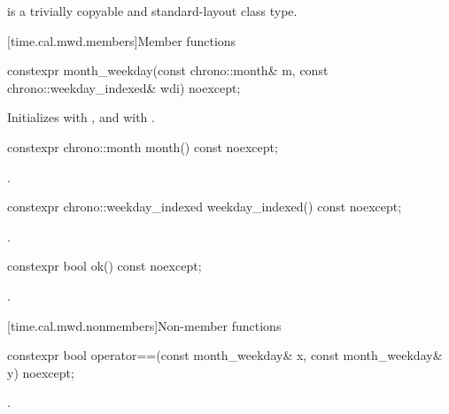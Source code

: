 \pnum
{} is a trivially copyable and standard-layout class type.

[time.cal.mwd.members]{Member functions}

%
\begin{itemdecl}
constexpr month_weekday(const chrono::month& m, const chrono::weekday_indexed& wdi) noexcept;
\end{itemdecl}

\begin{itemdescr}
\pnum
\effects
Initializes  with , and  with .
\end{itemdescr}

%
\begin{itemdecl}
constexpr chrono::month month() const noexcept;
\end{itemdecl}

\begin{itemdescr}
\pnum
\returns
{}.
\end{itemdescr}

%
\begin{itemdecl}
constexpr chrono::weekday_indexed weekday_indexed() const noexcept;
\end{itemdecl}

\begin{itemdescr}
\pnum
\returns
{}.
\end{itemdescr}

%
\begin{itemdecl}
constexpr bool ok() const noexcept;
\end{itemdecl}

\begin{itemdescr}
\pnum
\returns
{}.
\end{itemdescr}

[time.cal.mwd.nonmembers]{Non-member functions}

%
\begin{itemdecl}
constexpr bool operator==(const month_weekday& x, const month_weekday& y) noexcept;
\end{itemdecl}

\begin{itemdescr}
\pnum
\returns
{}.
\end{itemdescr}

